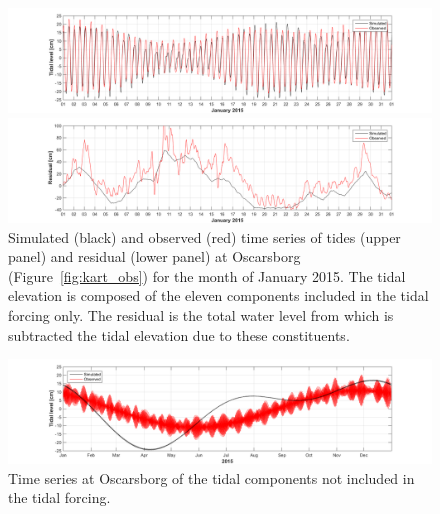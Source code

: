 \begin{figure}[tb] 
	\centerline{ \includegraphics*[trim=3cm 0cm 2.5cm 0cm,clip=true,width=\textwidth]{Figurer/Oscarsborg_Tide_selected_jan15} } 
	\centerline{ \includegraphics*[trim=3cm 0cm 2.5cm 0cm,clip=true,width=\textwidth]{Figurer/Oscarsborg_WL_rest_jan15} } 
 	\caption{\small Simulated (black) and observed (red) time series of tides (upper panel) and residual (lower panel) at Oscarsborg (Figure~\ref{fig:kart_obs}) for the month of January 2015. The tidal elevation is composed of the eleven components included in the tidal forcing only. The residual is the total water level from which is subtracted the tidal elevation due to these constituents.} 
	\label{fig:Waterlevel_jan15} 
\end{figure} 


\begin{figure}[tbh] 
	\centerline{ \includegraphics*[trim=3cm 0cm 2.5cm 0cm,clip=true,width=\textwidth]{Figurer/Oscarsborg_Tide_not_included} } 
	\caption{\small Time series at Oscarsborg of the tidal components not included in the tidal forcing.} 
	\label{fig:Waterlevel_tide} 
\end{figure} 

